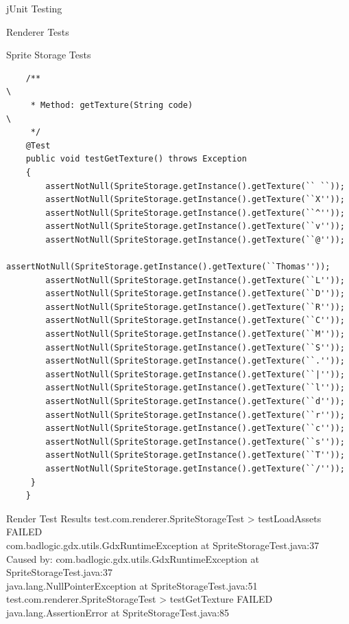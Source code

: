 \documentclass[12pt]{report}
\begin{document}
\begin{chapter}{jUnit Testing}
\begin{section}{Renderer Tests}
\begin{subsection}{Sprite Storage Tests}
\begin{lstlisting}
    /**                                                                                  \  
     * Method: getTexture(String code)                                                   \
     */
    @Test
    public void testGetTexture() throws Exception
    {
        assertNotNull(SpriteStorage.getInstance().getTexture(`` ``));                     
        assertNotNull(SpriteStorage.getInstance().getTexture(``X''));
        assertNotNull(SpriteStorage.getInstance().getTexture(``^''));
        assertNotNull(SpriteStorage.getInstance().getTexture(``v''));
        assertNotNull(SpriteStorage.getInstance().getTexture(``@''));
        assertNotNull(SpriteStorage.getInstance().getTexture(``Thomas''));
        assertNotNull(SpriteStorage.getInstance().getTexture(``L''));
        assertNotNull(SpriteStorage.getInstance().getTexture(``D''));
        assertNotNull(SpriteStorage.getInstance().getTexture(``R''));
        assertNotNull(SpriteStorage.getInstance().getTexture(``C''));
        assertNotNull(SpriteStorage.getInstance().getTexture(``M''));
        assertNotNull(SpriteStorage.getInstance().getTexture(``S''));
        assertNotNull(SpriteStorage.getInstance().getTexture(``.''));
        assertNotNull(SpriteStorage.getInstance().getTexture(``|''));
        assertNotNull(SpriteStorage.getInstance().getTexture(``l''));
        assertNotNull(SpriteStorage.getInstance().getTexture(``d''));
        assertNotNull(SpriteStorage.getInstance().getTexture(``r''));
        assertNotNull(SpriteStorage.getInstance().getTexture(``c''));
        assertNotNull(SpriteStorage.getInstance().getTexture(``s''));
        assertNotNull(SpriteStorage.getInstance().getTexture(``T''));
        assertNotNull(SpriteStorage.getInstance().getTexture(``/''));
     }
    }

    \end{lstlisting}
   \end{subsection}
  \end{section}
  \begin{section}{Render Test Results}
  	test.com.renderer.SpriteStorageTest > testLoadAssets FAILED\\
    	\hspace{4ex}com.badlogic.gdx.utils.GdxRuntimeException at SpriteStorageTest.java:37\\
        \hspace{4ex}Caused by: com.badlogic.gdx.utils.GdxRuntimeException at SpriteStorageTest.java:37\\
    	\hspace{4ex}java.lang.NullPointerException at SpriteStorageTest.java:51\\

	test.com.renderer.SpriteStorageTest > testGetTexture FAILED\\
	\hspace{4ex}java.lang.AssertionError at SpriteStorageTest.java:85\\
  \end{section}
 \end{chapter}
\end{document}
